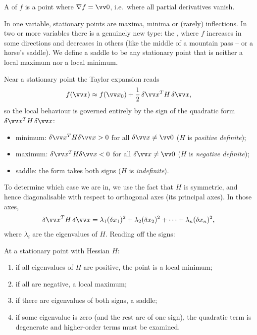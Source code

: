 \begin{definition}
	A  of $f$ is a point where $\nabla f = \vv 0$, i.e.\ where all partial derivatives vanish.
\end{definition}

In one variable, stationary points are maxima, minima or (rarely) inflections. In two or more variables there is a genuinely new type: the , where $f$ increases in some directions and decreases in others (like the middle of a mountain pass -- or a horse's saddle). We define a saddle to be any stationary point that is neither a local maximum nor a local minimum.

Near a stationary point the Taylor expansion reads
$$
f(\vv x) \approx f(\vv x_0) + \frac{1}{2}\, \delta \vv x^T H \, \delta \vv x,
$$
so the local behaviour is governed entirely by the sign of the quadratic form $\delta \vv x^T H \, \delta \vv x$:
\begin{itemize}
	\item minimum: $\delta \vv x^T H \delta \vv x > 0$ for all $\delta \vv x \neq \vv 0$ ($H$ is \emph{positive definite});
	\item maximum: $\delta \vv x^T H \delta \vv x < 0$ for all $\delta \vv x \neq \vv 0$ ($H$ is \emph{negative definite});
	\item saddle: the form takes both signs ($H$ is \emph{indefinite}).
\end{itemize}
To determine which case we are in, we use the fact that $H$ is symmetric, and hence diagonalisable with respect to orthogonal axes (its principal axes). In those axes,
$$
\delta \vv x^T H \, \delta \vv x = \lambda_1 (\delta x_1)^2 + \lambda_2 (\delta x_2)^2 + \cdots + \lambda_n (\delta x_n)^2,
$$
where $\lambda_i$ are the eigenvalues of $H$. Reading off the signs:

\begin{proposition}
	At a stationary point with Hessian $H$:
	\begin{enumerate}[label=(\roman*)]
		\item if all eigenvalues of $H$ are positive, the point is a local minimum;
		\item if all are negative, a local maximum;
		\item if there are eigenvalues of both signs, a saddle;
		\item if some eigenvalue is zero (and the rest are of one sign), the quadratic term is degenerate and higher-order terms must be examined.
	\end{enumerate}
\end{proposition}

